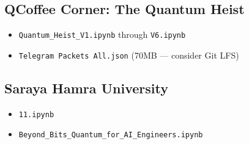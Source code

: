 \documentclass[11pt,a4paper]{article}
\begin{document}
\subsection{QCoffee Corner: The Quantum Heist}
\begin{itemize}
    \item \texttt{Quantum\_Heist\_V1.ipynb} through \texttt{V6.ipynb}
    \item \texttt{Telegram Packets All.json} (70MB --- consider Git LFS)
\end{itemize}

\subsection{Saraya Hamra University}
\begin{itemize}
    \item \texttt{11.ipynb}
    \item \texttt{Beyond\_Bits\_Quantum\_for\_AI\_Engineers.ipynb}
\end{itemize}

\end{document}
